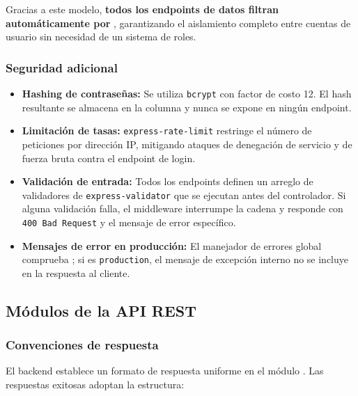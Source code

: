 Gracias a este modelo, \textbf{todos los endpoints de datos filtran
automáticamente por} , garantizando el
aislamiento completo entre cuentas de usuario sin necesidad de un
sistema de roles.

\subsubsection{Seguridad adicional}

\begin{itemize}
  \item \textbf{Hashing de contraseñas:} Se utiliza \texttt{bcrypt} con
    factor de costo 12. El hash resultante se almacena en la columna
     y nunca se expone en ningún endpoint.
  \item \textbf{Limitación de tasas:} \texttt{express-rate-limit}
    restringe el número de peticiones por dirección IP, mitigando
    ataques de denegación de servicio y de fuerza bruta contra el
    endpoint de login.
  \item \textbf{Validación de entrada:} Todos los endpoints definen
    un arreglo de validadores de \texttt{express-validator} que se
    ejecutan antes del controlador. Si alguna validación falla, el
    middleware  interrumpe la cadena
    y responde con \texttt{400 Bad Request} y el mensaje de error
    específico.
  \item \textbf{Mensajes de error en producción:} El manejador de
    errores global comprueba ; si es
    \texttt{production}, el mensaje de excepción interno no se incluye
    en la respuesta al cliente.
\end{itemize}

\subsection{Módulos de la API REST}

\subsubsection{Convenciones de respuesta}

El backend establece un formato de respuesta uniforme en el módulo
. Las respuestas exitosas adoptan la
estructura:

